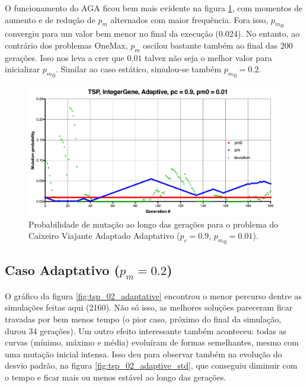 O funcionamento do AGA ficou bem mais evidente na figura \ref{fig:tsp_001_adaptive_pm}, com momentos de aumento e de redução de $p_m$ alternados com maior frequência. Fora isso, ${p_m}_0$ convergiu para um valor bem menor no final da execução (0.024). No entanto, ao contrário dos problemas OneMax, $p_m$ oscilou bastante também ao final das 200 gerações. Isso nos leva a crer que $0.01$ talvez não seja o melhor valor para inicializar ${p_m}_0$. Similar ao caso estático, simulou-se também ${p_m}_0 = 0.2$.

\begin{figure}[ht!]
    \centering \includegraphics[width=1.0\textwidth]{tsp_001_adaptive_pm.jpg}
    \caption{Probabilidade de mutação ao longo das gerações para o problema do Caixeiro Viajante Adaptado Adaptativo ($p_c=0.9$, ${p_m}_0=0.01$).}
    \label{fig:tsp_001_adaptive_pm}
\end{figure}

\subsection{Caso Adaptativo ($p_m = 0.2$)}

O gráfico da figura \ref{fig:tsp_02_adaptative} encontrou o menor percurso dentre as simulações feitas aqui (2160). Não só isso, as melhores soluções pareceram ficar travadas por bem menos tempo (o pior caso, próximo do final da simulação, durou 34 gerações). Um outro efeito interessante também aconteceu: todas as curvas (mínimo, máximo e média) evoluíram de formas semelhantes, mesmo com uma mutação inicial intensa. Isso deu para observar também na evolução do desvio padrão, na figura \ref{fig:tsp_02_adaptive_std}, que conseguiu diminuir com o tempo e ficar mais ou menos estável ao longo das gerações.

